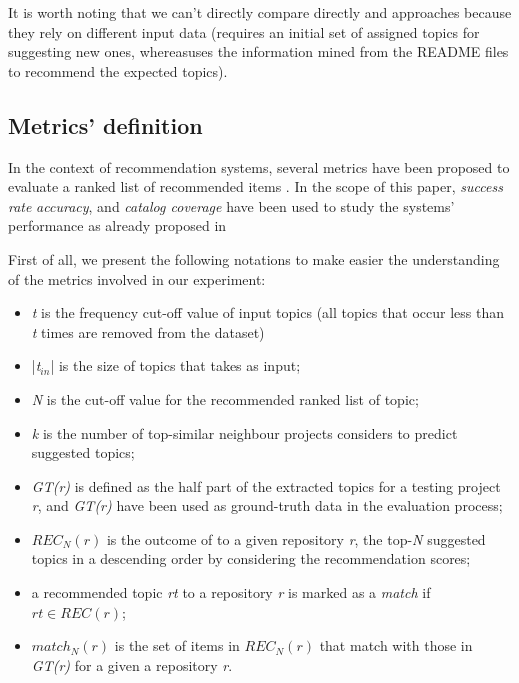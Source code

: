 It is worth noting that we can't directly compare directly \CT and \MNB approaches because they rely on different input data (\ie \CT requires an initial set of assigned topics for suggesting new ones, whereas\MNB uses the information mined from the README files to recommend the expected topics). 


\subsection{Metrics' definition}\label{sec:metrics}

In the context of recommendation systems, several metrics have been proposed to evaluate a ranked list of recommended items \cite{DBLP:conf/rweb/NoiaO15}. In the scope of this paper, \emph{success rate} \emph{accuracy}, and \emph{catalog coverage} have been used to study the systems' performance as already proposed in \etal~\cite{Robillard:2014:RSS:2631387}

First of all, we present the following notations to make easier the understanding of the metrics involved in our experiment:
\begin{itemize}[noitemsep,topsep=0pt]
	\item \emph{t} is the frequency cut-off value of input topics (\ie all topics that occur less than \emph{t} times are removed from the dataset)
	\item |\emph{t$_{in}$}| is the size of topics that \CT takes as input;
	\item \emph{N} is the cut-off value for the recommended ranked list of topic;%
	\item \emph{k} is the number of top-similar neighbour projects \TF considers to predict suggested topics;
	\item \emph{GT(r)} is defined as the half part of the extracted topics for a testing project \emph{r}, and \emph{GT(r)} have been used as ground-truth data in the evaluation process;
	\item $REC_{N}(r)$ is the outcome of \TF to a given repository \emph{r}, \ie the top-\emph{N}  suggested topics in a descending order by considering the recommendation scores;
	\item a recommended topic \emph{rt} to a repository \emph{r} is marked as a \emph{match} if $rt \in REC(r)$;
	\item  $match_{N}(r)$ is the set of items in $REC_{N}(r)$ that match with those in \emph{GT(r)} for a given a repository \emph{r}.
\end{itemize}



